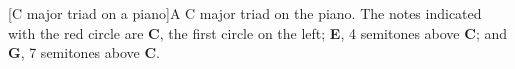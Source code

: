 [C major triad on a piano]A C major triad on the piano. The notes indicated with the red circle are \textbf{C}, the first circle on the left; \textbf{E}, 4 semitones above \textbf{C}; and \textbf{G}, 7 semitones above \textbf{C}.
